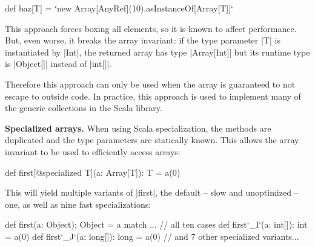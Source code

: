 \begin{lstlisting-nobreak}
 def baz[T] = `new Array[AnyRef](10).asInstanceOf[Array[T]]`
\end{lstlisting-nobreak}

This approach forces boxing all elements, so it is known to affect performance. But, even worse, it breaks the array invariant: if the type parameter |T| is instantiated by |Int|, the returned array has type |Array[Int]| but its runtime type is |Object[]| instead of |int[]|.

Therefore this approach can only be used when the array is guaranteed to not escape to outside code. In practice, this approach is used to implement many of the generic collections in the Scala library.

%



\textbf{Specialized arrays.} When using Scala specialization, the methods are duplicated and the type parameters are statically known. This allows the array invariant to be used to efficiently access arrays:

\begin{lstlisting-nobreak}
 def first[@specialized T](a: Array[T]): T = a(0)
\end{lstlisting-nobreak}

This will yield multiple variants of |first|, the default -- slow and unoptimized -- one, as well as nine fast specializations:

\begin{lstlisting-nobreak}
 def first(a: Object): Object =
   a match {
     ... // all ten cases
   }
 def first`_I`(a: int[]): int = a(0)
 def first`_J`(a: long[]): long = a(0)
 // and 7 other specialized variants...
\end{lstlisting-nobreak}


